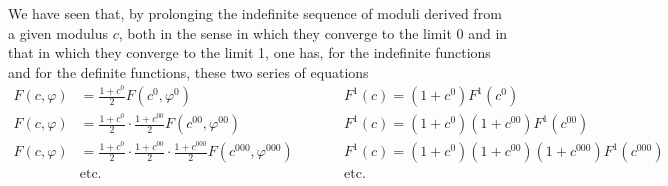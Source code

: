 \documentclass{article}
\begin{document}
We have seen that, by prolonging the indefinite sequence of moduli derived from a given modulus $c$, both in the sense in which they converge to the limit 0 and in that in which they converge to the limit 1, one has, for the indefinite functions and for the definite functions, these two series of equations
\[ \begin{aligned} F(c,\varphi)&=\frac{1+c^{0}}{2}F(c^{0},\varphi^{0}) &\qquad& F^{1}(c)=(1+c^{0})F^{1}(c^{0})\\ F(c,\varphi)&=\frac{1+c^{0}}{2}\cdot\frac{1+c^{00}}{2}F(c^{00},\varphi^{00}) && F^{1}(c)=(1+c^{0})(1+c^{00})F^{1}(c^{00})\\ F(c,\varphi)&=\frac{1+c^{0}}{2}\cdot\frac{1+c^{00}}{2}\cdot\frac{1+c^{000}}{2}F(c^{000},\varphi^{000}) && F^{1}(c)=(1+c^{0})(1+c^{00})(1+c^{000})F^{1}(c^{000})\\ &\text{etc.} && \text{etc.} \end{aligned} \]
\end{document}
